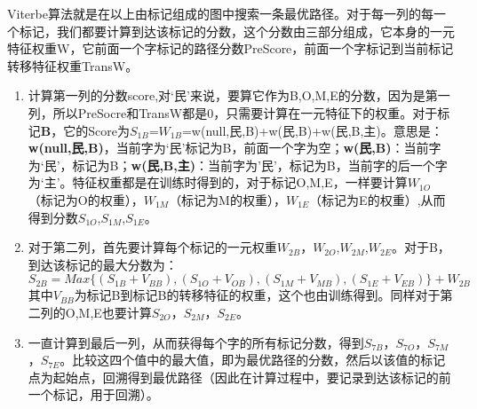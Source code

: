 \par Viterbe算法就是在以上由标记组成的图中搜索一条最优路径。对于每一列的每一个标记，我们都要计算到达该标记的分数，这个分数由三部分组成，它本身的一元特征权重W，它前面一个字标记的路径分数PreScore，前面一个字标记到当前标记转移特征权重TransW。
\begin{enumerate}[(1)]
\item 计算第一列的分数score,对‘民’来说，要算它作为B,O,M,E的分数，因为是第一列，所以PreSocre和TransW都是0，只需要计算在一元特征下的权重。对于标记\textbf{B}，它的Score为$S_{1B}$=$W_{1B}$=w(null,民,B)+w(民,B)+w(民,B,主)。意思是：\textbf{w(null,民,B)}，当前字为‘民’标记为B，前面一个字为空；\textbf{w(民,B)}：当前字为‘民’，标记为B；\textbf{w(民,B,主)}：当前字为’民’，标记为B，当前字的后一个字为‘主’。特征权重都是在训练时得到的，对于标记O,M,E，一样要计算$W_{1O}$（标记为O的权重），$W_{1M}$（标记为M的权重），$W_{1E}$（标记为E的权重）,从而得到分数$S_{1O}$,$S_{1M}$,$S_{1E}$。
\item 对于第二列，首先要计算每个标记的一元权重$W_{2B}$，$W_{2O}$,$W_{2M}$,$W_{2E}$。对于B，到达该标记的最大分数为：$$S_{2B}=Max\{(S_{1B}+V_{BB}),(S_{1O}+V_{OB}),(S_{1M}+V_{MB}),(S_{1E}+V_{EB})\}+W_{2B}$$
其中$V_{BB}$为标记B到标记B的转移特征的权重，这个也由训练得到。同样对于第二列的O,M,E也要计算$S_{2O}$，$S_{2M}$，$S_{2E}$。
\item 一直计算到最后一列，从而获得每个字的所有标记分数，得到$S_{7B}$，$S_{7O}$，$S_{7M}$，$S_{7E}$。比较这四个值中的最大值，即为最优路径的分数，然后以该值的标记点为起始点，回溯得到最优路径（因此在计算过程中，要记录到达该标记的前一个标记，用于回溯）。
\end{enumerate}
